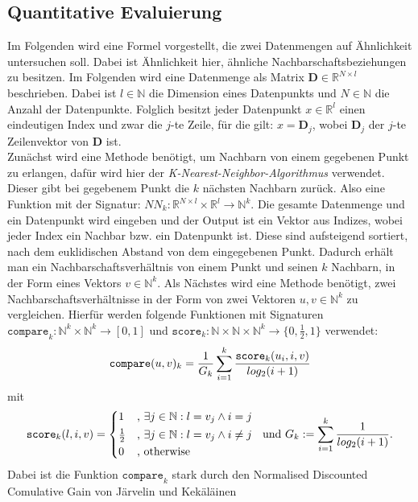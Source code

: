 \documentclass[12pt,letterpaper,ngerman]{article}
\begin{document}
\subsection{Quantitative Evaluierung} 
Im Folgenden wird eine Formel vorgestellt, die zwei Datenmengen
auf Ähnlichkeit untersuchen soll. Dabei ist Ähnlichkeit hier,
ähnliche Nachbarschaftsbeziehungen zu besitzen. Im Folgenden wird
eine Datenmenge als Matrix  $\mathbf{D} \in \mathbb{R}^{N\times l}$
beschrieben. Dabei ist $l \in \mathbb{N}$ die Dimension eines
Datenpunkts und $N \in \mathbb{N}$ die Anzahl der Datenpunkte. 
Folglich besitzt jeder Datenpunkt $x \in \mathbb{R}^l$ einen 
eindeutigen Index und zwar die $j$-te Zeile, für die gilt:
$x = \mathbf{D}_j$,  wobei $\mathbf{D}_j$  der $j$-te Zeilenvektor 
von $\mathbf{D}$ ist.\\ 
Zunächst wird eine Methode benötigt, um Nachbarn von einem gegebenen
Punkt zu erlangen, dafür wird hier der
\textit{K-Nearest-Neighbor-Algorithmus} verwendet. Dieser gibt bei
gegebenem Punkt die $k$ nächsten Nachbarn zurück. Also eine Funktion
mit der Signatur:
$NN_k: \mathbb{R}^{N\times l} \times \mathbb{R}^{l} \to \mathbb{N}^k$. 
Die gesamte Datenmenge und ein Datenpunkt wird eingeben und der 
Output ist ein Vektor aus Indizes, wobei jeder Index ein Nachbar 
bzw. ein Datenpunkt ist.
Diese sind aufsteigend sortiert, nach dem euklidischen Abstand 
von dem eingegebenen Punkt. Dadurch erhält man ein 
Nachbarschaftsverhältnis von einem Punkt
und seinen $k$ Nachbarn, in der Form eines Vektors
$v \in \mathbb{N}^k$.
Als Nächstes wird eine Methode benötigt, zwei 
Nachbarschaftsverhältnisse in der Form von zwei Vektoren
$u, v \in \mathbb{N}^k$ zu vergleichen.
Hierfür werden folgende Funktionen mit Signaturen
$\texttt{compare}_k:\mathbb{N}^k \times \mathbb{N}^k \to [0,1]$ 
und $\texttt{score}_k: \mathbb{N} \times \mathbb{N} \times
\mathbb{N}^k \to \{0, \frac{1}{2}, 1\}$
verwendet:
\[
    \verb|compare|(u,v)_k = 
      \frac{1}{G_k} \sum^{k}_{i=1} 
      \frac{ \texttt{score}_{k}(u_i,i,v)}{log_2(i+1)}
\]
mit
\[
  \texttt{score}_k(l,i,v) = \begin{cases*} 
      1 & , $\exists j \in \mathbb{N}: l = v_j \land i = j$   \\
      \frac{1}{2} & , $\exists j \in \mathbb{N}: l = v_j \land i \neq j$\\
      0   & , \text{otherwise}
    \end{cases*}  \text{  und  }
    G_k := \sum_{i=1}^{k} \frac{1}{log_2(i+1)}.
\]
Dabei ist die Funktion $\texttt{compare}_k$ stark durch den
Normalised Discounted Comulative Gain von Järvelin und Kekäläinen
\end{document}
